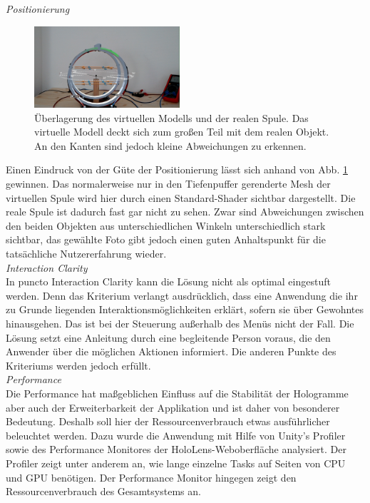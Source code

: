 \textit{Positionierung}
\begin{figure}
	\centering
	\includegraphics[width=0.48\textwidth]{images/HL/model-overlay.jpg}
	\caption{Überlagerung des virtuellen Modells und der realen Spule. Das virtuelle Modell deckt sich zum großen Teil mit dem realen Objekt. An den Kanten sind jedoch kleine Abweichungen zu erkennen.}
	\label{img:model-overlay}
\end{figure}
Einen Eindruck von der Güte der Positionierung lässt sich anhand von Abb. \ref{img:model-overlay} gewinnen. Das normalerweise nur in den Tiefenpuffer gerenderte Mesh der virtuellen Spule wird hier durch einen Standard-Shader sichtbar dargestellt. Die reale Spule ist dadurch fast gar nicht zu sehen. Zwar sind Abweichungen zwischen den beiden Objekten aus unterschiedlichen Winkeln unterschiedlich stark sichtbar, das gewählte Foto gibt jedoch einen guten Anhaltspunkt für die tatsächliche Nutzererfahrung wieder.\\

\textit{Interaction Clarity}\\
In puncto Interaction Clarity kann die Lösung nicht als optimal eingestuft werden. Denn das Kriterium verlangt ausdrücklich, dass eine Anwendung die ihr zu Grunde liegenden Interaktionsmöglichkeiten erklärt, sofern sie über Gewohntes hinausgehen. Das ist bei der Steuerung außerhalb des Menüs nicht der Fall. Die Lösung setzt eine Anleitung durch eine begleitende Person voraus, die den Anwender über die möglichen Aktionen informiert. Die anderen Punkte des Kriteriums werden jedoch erfüllt.\\

\textit{Performance}\\
Die Performance hat maßgeblichen Einfluss auf die Stabilität der Hologramme aber auch der Erweiterbarkeit der Applikation und ist daher von besonderer Bedeutung. Deshalb soll hier der Ressourcenverbrauch etwas ausführlicher beleuchtet werden. Dazu wurde die Anwendung mit Hilfe von Unity's Profiler sowie des Performance Monitores der HoloLens-Weboberfläche analysiert. Der Profiler zeigt unter anderem an, wie lange einzelne Tasks auf Seiten von CPU und GPU benötigen. Der Performance Monitor hingegen zeigt den Ressourcenverbrauch des Gesamtsystems an.\\

